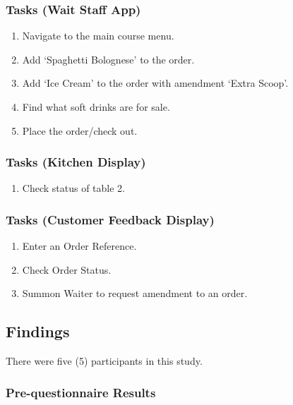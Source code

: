 \documentclass[11pt, a4paper]{report}
\begin{document}
\subsubsection{Tasks (Wait Staff App)} 

\begin{enumerate} 
\item Navigate   to   the   main   course   menu.
\item Add   ‘Spaghetti   Bolognese’   to   the   order.
\item Add   ‘Ice   Cream’   to   the   order   with   amendment   ‘Extra   Scoop’.
\item Find   what   soft   drinks   are   for   sale.
\item Place   the   order/check   out.
\end{enumerate} 


\subsubsection{Tasks (Kitchen Display)} 

\begin{enumerate} 
\item Check   status   of   table   2.
\end{enumerate} 


\subsubsection{Tasks (Customer Feedback Display)} 

\begin{enumerate} 
\item Enter an Order Reference.
\item Check Order Status.
\item Summon Waiter to request amendment to an order.
\end{enumerate} 


\subsection{Findings} 
There were five (5) participants in this study.


\subsubsection{Pre-questionnaire Results} 
\end{document}
